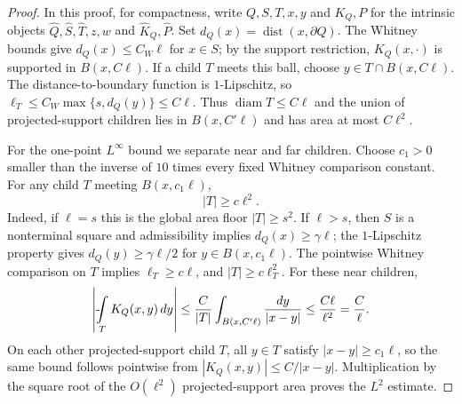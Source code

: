 \documentclass[11pt]{article}
\theoremstyle{definition}
\theoremstyle{remark}
\numberwithin{equation}{section}
\newcommand{\dist}{\operatorname{dist}}
\newcommand{\diam}{\operatorname{diam}}
\renewcommand{\fint}{\mathop{\rlap{-}\!\int}}
\begin{document}
\begin{proof}
In this proof, for compactness, write $Q,S,T,x,y$ and $K_Q,P$
for the intrinsic objects $\widehat Q,\widehat S,\widehat T,z,w$
and $\widehat K_Q,\widehat P$. Set $d_Q(x)=\dist(x,\partial Q)$.
The Whitney bounds give $d_Q(x)\le C_W\ell$ for $x\in S$;
by the support restriction, $K_Q(x,\cdot)$ is supported in
$B(x,C\ell)$. If a child $T$ meets this ball, choose
$y\in T\cap B(x,C\ell)$. The distance-to-boundary function is
$1$-Lipschitz, so
$\ell_T\le C_W\max\{s,d_Q(y)\}\le C\ell$.
Thus $\diam T\le C\ell$ and the union of projected-support
children lies in $B(x,C'\ell)$ and has area at most $C\ell^2$.

For the one-point $L^\infty$ bound we separate near and far
children. Choose $c_1>0$ smaller than
the inverse of $10$ times every fixed Whitney comparison constant.
For any child $T$ meeting $B(x,c_1\ell)$,
\begin{equation}\label{eq:nearchild}
 |T|\ge c\ell^2.
\end{equation}
Indeed, if $\ell=s$ this is the global area floor $|T|\ge s^2$.
If $\ell>s$, then $S$ is a nonterminal square and admissibility
implies $d_Q(x)\ge\gamma\ell$; the $1$-Lipschitz property gives
$d_Q(y)\ge\gamma\ell/2$ for $y\in B(x,c_1\ell)$.
The pointwise Whitney comparison on $T$ implies $\ell_T\ge c\ell$,
and $|T|\ge c\ell_T^2$.
For these near children,
\[
 \left|\fint_T K_Q(x,y)\,dy\right|
 \le \frac{C}{|T|}\int_{B(x,C'\ell)}\frac{dy}{|x-y|}
 \le \frac{C\ell}{\ell^2}=\frac{C}{\ell}.
\]
On each other projected-support child $T$, all $y\in T$ satisfy
$|x-y|\ge c_1\ell$, so the same bound follows pointwise from
$|K_Q(x,y)|\le C/|x-y|$. Multiplication by the square root of
the $O(\ell^2)$ projected-support area proves the $L^2$ estimate.


\end{proof}
\end{document}
